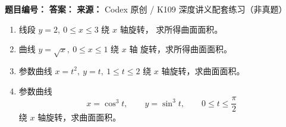 \begin{problemBox}
\begin{problemMeta}
\textbf{题目编号：} \quad
\textbf{答案：} \quad
\textbf{来源：} Codex 原创 / K109 深度讲义配套练习（非真题）
\end{problemMeta}
\begin{enumerate}
  \item[\textbf{A}] 线段 \(y=2,\ 0\le x\le3\) 绕 \(x\) 轴旋转，
  求所得曲面面积。
  \item[\textbf{B}] 曲线 \(y=\sqrt x,\ 0\le x\le1\) 绕 \(x\) 轴
  旋转，求所得曲面面积。
  \item[\textbf{C}] 参数曲线
  \(x=t^2,\ y=t,\ 1\le t\le2\) 绕 \(x\) 轴旋转，求曲面面积。
  \item[\textbf{M}] 参数曲线
  \[
  x=\cos^3t,\qquad y=\sin^3t,\qquad0\le t\le\frac\pi2
  \]
  绕 \(x\) 轴旋转，求曲面面积。
\end{enumerate}
\end{problemBox}
